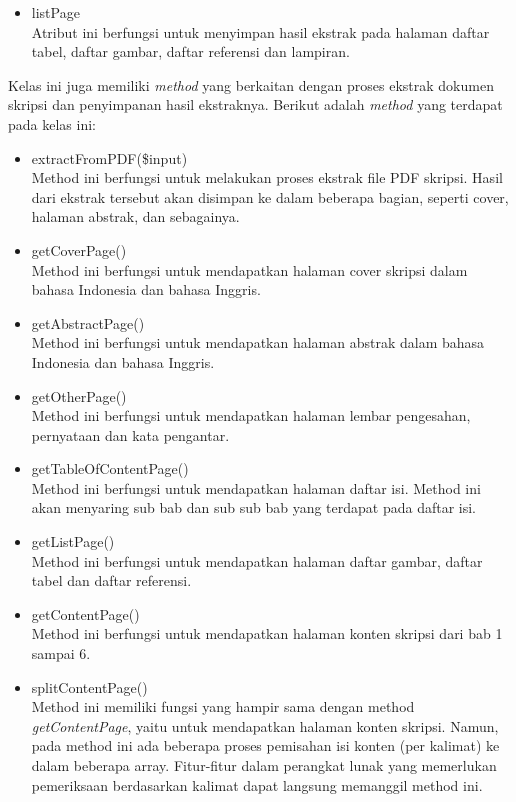 \begin{enumerate}
\begin{itemize}
			\item listPage \\
			Atribut ini berfungsi untuk menyimpan hasil ekstrak pada halaman daftar tabel, daftar gambar, daftar referensi dan lampiran.
			
		\end{itemize}
	
	Kelas ini juga memiliki \textit{method} yang berkaitan dengan proses ekstrak dokumen skripsi dan penyimpanan hasil ekstraknya. Berikut adalah \textit{method} yang terdapat pada kelas ini:
		
		\begin{itemize}
			\item extractFromPDF(\$input) \\
			Method ini berfungsi untuk melakukan proses ekstrak file PDF skripsi. Hasil dari ekstrak tersebut akan disimpan ke dalam beberapa bagian, seperti cover, halaman abstrak, dan sebagainya. 
			
			\item getCoverPage() \\
			Method ini berfungsi untuk mendapatkan halaman cover skripsi dalam bahasa Indonesia dan bahasa Inggris.
			
			\item getAbstractPage() \\
			Method ini berfungsi untuk mendapatkan halaman abstrak dalam bahasa Indonesia dan bahasa Inggris.
			
			\item getOtherPage() \\
			Method ini berfungsi untuk mendapatkan halaman lembar pengesahan, pernyataan dan kata pengantar.
			
			\item getTableOfContentPage() \\
			Method ini berfungsi untuk mendapatkan halaman daftar isi. Method ini akan menyaring sub bab dan sub sub bab yang terdapat pada daftar isi.
			
			\item getListPage() \\
			Method ini berfungsi untuk mendapatkan halaman daftar gambar, daftar tabel dan daftar referensi.
			
			\item getContentPage() \\
			Method ini berfungsi untuk mendapatkan halaman konten skripsi dari bab 1 sampai 6.
			
			\item splitContentPage() \\
			Method ini memiliki fungsi yang hampir sama dengan method \textit{getContentPage}, yaitu untuk mendapatkan halaman konten skripsi. Namun, pada method ini ada beberapa proses pemisahan isi konten (per kalimat) ke dalam beberapa array. Fitur-fitur dalam perangkat lunak yang memerlukan pemeriksaan berdasarkan kalimat dapat langsung memanggil method ini. 
			

\end{itemize}
\end{enumerate}
